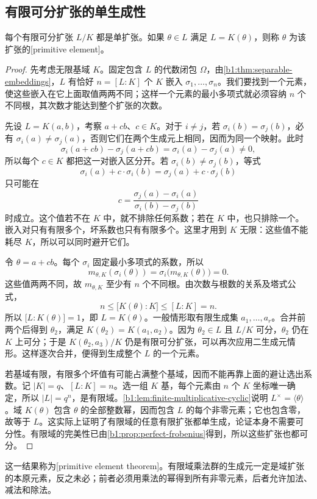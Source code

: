 \subsection{有限可分扩张的单生成性}
\label{b1:subsec:1604:01}

\begin{theorem}[本原元素]\label{b1:thm:primitive-element}
	每个有限可分扩张 \(L/K\) 都是单扩张。如果 \(\theta\in L\) 满足 \(L=K(\theta)\)，则称 \(\theta\) 为该扩张的[primitive element]。
\end{theorem}
\begin{proof}
	先考虑无限基域 \(K\)。固定包含 \(L\) 的代数闭包 \(\Omega\)，由\cref{b1:thm:separable-embeddings}，\(L\) 有恰好 \(n=[L:K]\) 个 \(K\) 嵌入 \(\sigma_1,\ldots,\sigma_n\)。我们要找到一个元素，使这些嵌入在它上面取值两两不同；这样一个元素的最小多项式就必须容纳 \(n\) 个不同根，其次数才能达到整个扩张的次数。

	先设 \(L=K(a,b)\)，考察 \(a+cb\)、\(c\in K\)。对于 \(i\neq j\)，若 \(\sigma_i(b)=\sigma_j(b)\)，必有 \(\sigma_i(a)\neq\sigma_j(a)\)，否则它们在两个生成元上相同，因而为同一个映射。此时
	\[
		\sigma_i(a+cb)-\sigma_j(a+cb)=\sigma_i(a)-\sigma_j(a)\ne0,
	\]
	所以每个 \(c\in K\) 都把这一对嵌入区分开。若 \(\sigma_i(b)\neq\sigma_j(b)\)，等式
	\[
		\sigma_i(a)+c\cdot\sigma_i(b)=\sigma_j(a)+c\cdot\sigma_j(b)
	\]
	只可能在
	\[
		c=\frac{\sigma_j(a)-\sigma_i(a)}{\sigma_i(b)-\sigma_j(b)}
	\]
	时成立。这个值若不在 \(K\) 中，就不排除任何系数；若在 \(K\) 中，也只排除一个。嵌入对只有有限多个，坏系数也只有有限多个。这里才用到 \(K\) 无限：这些值不能耗尽 \(K\)，所以可以同时避开它们。

	令 \(\theta=a+cb\)。每个 \(\sigma_i\) 固定最小多项式的系数，所以
	\[
		m_{\theta,K}(\sigma_i(\theta)) =\sigma_i\bigl(m_{\theta,K}(\theta)\bigr)=0.
	\]
	这些值两两不同，故 \(m_{\theta,K}\) 至少有 \(n\) 个不同根。由次数与根数的关系及塔式公式，
	\[
		n\leq\bigl[K(\theta):K\bigr]\leq[L:K]=n.
	\]
	所以 \(\bigl[L:K(\theta)\bigr]=1\)，即 \(L=K(\theta)\)。一般情形取有限生成集 \(a_1,\ldots,a_r\)。合并前两个后得到 \(\theta_2\)，满足 \(K(\theta_2)=K(a_1,a_2)\)。因为 \(\theta_2\in L\) 且 \(L/K\) 可分，\(\theta_2\) 仍在 \(K\) 上可分；于是 \(K(\theta_2,a_3)/K\) 仍是有限可分扩张，可以再次应用二生成元情形。这样逐次合并，便得到生成整个 \(L\) 的一个元素。

	若基域有限，有限多个坏值有可能占满整个基域，因而不能再靠上面的避让选出系数。记 \(\lvert K\rvert=q\)、\([L:K]=n\)。选一组 \(K\) 基，每个元素由 \(n\) 个 \(K\) 坐标唯一确定，所以 \(\lvert L\rvert=q^n\)，是有限域。\cref{b1:lem:finite-multiplicative-cyclic}说明 \(L^\times=\langle\theta\rangle\)。域 \(K(\theta)\) 包含 \(\theta\) 的全部整数幂，因而包含 \(L\) 的每个非零元素；它也包含零，故等于 \(L\)。这实际上证明了有限域的任意有限扩张都单生成，论证本身不需要可分性。有限域的完美性已由\cref{b1:prop:perfect-frobenius}得到，所以这些扩张也都可分。
\end{proof}
这一结果称为[primitive element theorem]。有限域乘法群的生成元一定是域扩张的本原元素，反之未必；前者必须用乘法的幂得到所有非零元素，后者允许加法、减法和除法。

